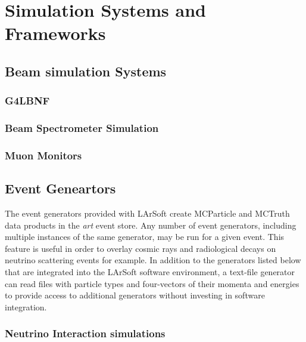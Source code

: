 %
\chapter{Simulation Systems and Frameworks}  %
\section{Beam simulation Systems}

\subsection{G4LBNF}

\subsection{Beam Spectrometer Simulation}

\subsection{Muon Monitors}

\section{Event Geneartors}

The event generators provided with LArSoft create MCParticle and MCTruth data products in
the {\it{art}} event store.  Any number of event generators, including multiple instances of the
same generator, may be run for a given event.  This feature is useful in order to overlay cosmic
rays and radiological decays on neutrino scattering events for example.  In addition to the
generators listed below that are integrated into the LArSoft software environment, a text-file generator
can read files with particle types and four-vectors of their momenta and energies to provide access
to additional generators without investing in software integration.

\subsection{Neutrino Interaction simulations}

